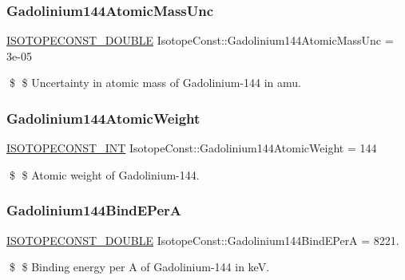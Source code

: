 \subsubsection{\texorpdfstring{Gadolinium144\+Atomic\+Mass\+Unc}{Gadolinium144AtomicMassUnc}}
{\footnotesize\ttfamily \mbox{\hyperlink{group___isotope_const-_macros_ga8f45a7272ce02c0b4c65c44636ed719a}{I\+S\+O\+T\+O\+P\+E\+C\+O\+N\+S\+T\+\_\+\+D\+O\+U\+B\+LE}} Isotope\+Const\+::\+Gadolinium144\+Atomic\+Mass\+Unc = 3e-\/05}

\$ \$ Uncertainty in atomic mass of Gadolinium-\/144 in amu. \mbox{\label{group___isotope_const-_gadolinium-_gd144_gaa202d2f65a0baf8d6dbd605c0721fa7b}} 
\subsubsection{\texorpdfstring{Gadolinium144\+Atomic\+Weight}{Gadolinium144AtomicWeight}}
{\footnotesize\ttfamily \mbox{\hyperlink{group___isotope_const-_macros_ga5f18360b3e99483a35c32d789e62621c}{I\+S\+O\+T\+O\+P\+E\+C\+O\+N\+S\+T\+\_\+\+I\+NT}} Isotope\+Const\+::\+Gadolinium144\+Atomic\+Weight = 144}

\$ \$ Atomic weight of Gadolinium-\/144. \mbox{\label{group___isotope_const-_gadolinium-_gd144_ga701958f4a88e48c6efed14c2477105f2}} 
\subsubsection{\texorpdfstring{Gadolinium144\+Bind\+E\+PerA}{Gadolinium144BindEPerA}}
{\footnotesize\ttfamily \mbox{\hyperlink{group___isotope_const-_macros_ga8f45a7272ce02c0b4c65c44636ed719a}{I\+S\+O\+T\+O\+P\+E\+C\+O\+N\+S\+T\+\_\+\+D\+O\+U\+B\+LE}} Isotope\+Const\+::\+Gadolinium144\+Bind\+E\+PerA = 8221.}

\$ \$ Binding energy per A of Gadolinium-\/144 in keV. \mbox{\label{group___isotope_const-_gadolinium-_gd144_ga75b80c9b633d84499f27d6bc9b35378d}} 
